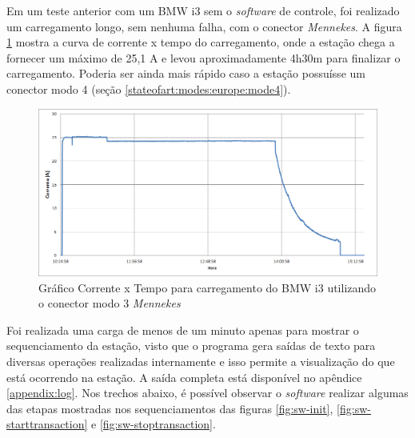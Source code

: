     Em um teste anterior com um BMW i3 sem o \textit{software} de controle, foi realizado um carregamento longo, sem nenhuma falha, com o conector \textit{Mennekes}. A figura \ref{fig:evse-charge} mostra a curva de corrente x tempo do carregamento, onde a estação chega a fornecer um máximo de 25,1 A e levou aproximadamente 4h30m para finalizar o carregamento. Poderia ser ainda mais rápido caso a estação possuísse um conector modo 4 (seção \ref{stateofart:modes:europe:mode4}).

    \begin{figure}[H]
      \begin{center}
        \includegraphics[width=\textwidth,natwidth=1420,natheight=2130]{assets/images/evse-charge.png}
        \caption{Gráfico Corrente x Tempo para carregamento do BMW i3 utilizando o conector modo 3 \textit{Mennekes}}
        \label{fig:evse-charge}
      \end{center}
    \end{figure}

    Foi realizada uma carga de menos de um minuto apenas para mostrar o sequenciamento da estação, visto que o programa gera saídas de texto para diversas operações realizadas internamente e isso permite a visualização do que está ocorrendo na estação. A saída completa está disponível no apêndice \ref{appendix:log}. Nos trechos abaixo, é possível observar o \textit{software} realizar algumas das etapas mostradas nos sequenciamentos das figuras \ref{fig:sw-init}, \ref{fig:sw-starttransaction} e \ref{fig:sw-stoptransaction}.

